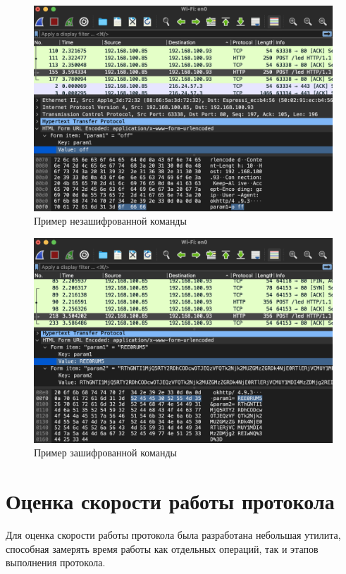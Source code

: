 	\begin{figure}[H]
		\centering
		\includegraphics[scale=0.6]{resources/wireshark-encryption-disabled}
		\caption{Пример незашифрованной команды}
		\label{fig4.8}
	\end{figure}

	\begin{figure}[H]
		\centering
		\includegraphics[scale=0.6]{resources/wireshark-encryption-enabled}
		\caption{Пример зашифрованной команды}
		\label{fig4.9}
	\end{figure}


	\section{Оценка скорости работы протокола}
	
	Для оценка скорости работы протокола была разработана небольшая утилита, способная замерять
	время работы как отдельных операций, так и этапов выполнения протокола.
	
